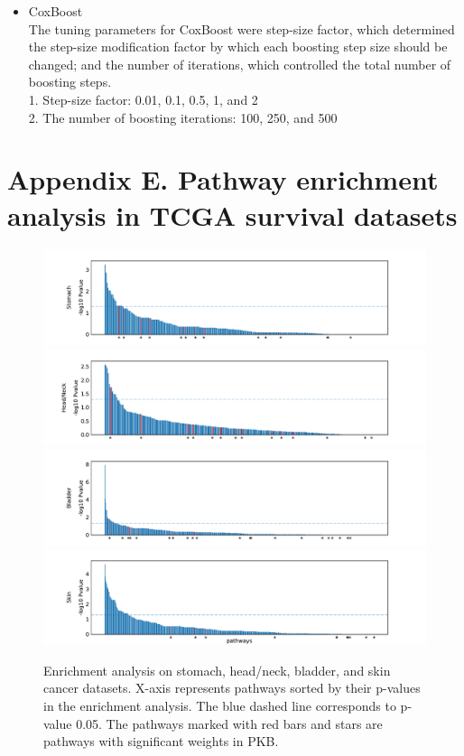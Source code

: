 \documentclass[a4paper,12pt]{article}
\begin{document}
\begin{itemize}
		\item CoxBoost\\
		The tuning parameters for CoxBoost were step-size factor, which determined the step-size modification factor by which each boosting step size should be changed; and the number of iterations, which controlled the total number of boosting steps. \\
		1.	Step-size factor: 0.01, 0.1, 0.5, 1, and 2\\
		2.	The number of boosting iterations: 100, 250, and 500 
	\end{itemize}
\newpage
\section*{Appendix E. Pathway enrichment analysis in TCGA survival datasets}\label{sec:gsea}
\begin{figure}[htp]
	\centering
	\includegraphics[width=\textwidth]{GSEA_Stomach.pdf}\\ \vspace{-3mm}
	\includegraphics[width=\textwidth]{GSEA_Head_Neck.pdf}\\ \vspace{-3mm}
	\includegraphics[width=\textwidth]{GSEA_Bladder.pdf}\\ \vspace{-3mm}
	\includegraphics[width=\textwidth]{GSEA_Skin.pdf}
	\caption{Enrichment analysis on stomach, head/neck, bladder, and skin cancer datasets. X-axis represents pathways sorted by their p-values in the enrichment analysis. The blue dashed line corresponds to p-value 0.05. The pathways marked with red bars and stars are pathways with significant weights in PKB.}
\end{figure}
\newpage
\end{document}
